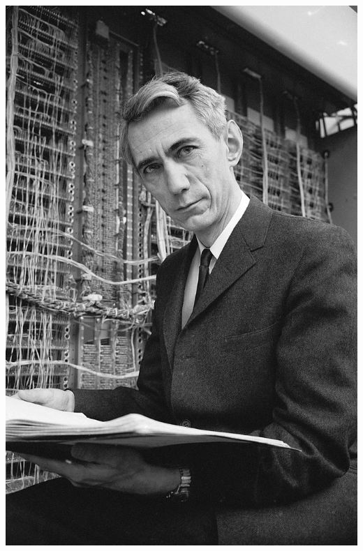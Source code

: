 \documentclass[smaller]{beamer}
\begin{document}
\begin{frame}
\begin{columns}
    \begin{column}{0.4\textwidth}
        \includegraphics[width=\textwidth]{../manifest/shannon.png}
    \end{column}
\end{columns}
\end{frame}

\end{document}
